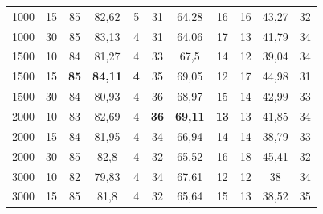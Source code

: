 \begin{table}[ht]
\begin{tabular}{cc|ccc|ccc|ccc}
        {1000}   & {15}     & {85}                                & {82,62}                             & {5}                                      & {31}          & {64,28}        & {16}        & {16}          & {43,27}        & {32}        \\
        {1000}   & {30}     & {85}                                & {83,13}                             & {4}                                      & {31}          & {64,06}        & {17}        & {13}          & {41,79}        & {34}        \\
        {1500}   & {10}     & {84}                                & {81,27}                             & {4}                                      & {33}          & {67,5}         & {14}        & {12}          & {39,04}        & {34}        \\
        {1500}   & {15}     & \textbf{85}                         & \textbf{84,11}                      & \textbf{4}                               & {35}          & {69,05}        & {12}        & {17}          & {44,98}        & {31}        \\
        {1500}   & {30}     & {84}                                & {80,93}                             & {4}                                      & {36}          & {68,97}        & {15}        & {14}          & {42,99}        & {33}        \\
        {2000}   & {10}     & {83}                                & {82,69}                             & {4}                                      & \textbf{36}   & \textbf{69,11} & \textbf{13} & {13}          & {41,85}        & {34}        \\
        {2000}   & {15}     & {84}                                & {81,95}                             & {4}                                      & {34}          & {66,94}        & {14}        & {14}          & {38,79}        & {33}        \\
        {2000}   & {30}     & {85}                                & {82,8}                              & {4}                                      & {32}          & {65,52}        & {16}        & {18}          & {45,41}        & {32}        \\
        {3000}   & {10}     & {82}                                & {79,83}                             & {4}                                      & {34}          & {67,61}        & {12}        & {12}          & {38}           & {34}        \\
        {3000}   & {15}     & {85}                                & {81,8}                              & {4}                                      & {32}          & {65,64}        & {15}        & {13}          & {38,52}        & {35}        \\

\end{tabular}
\end{table}
